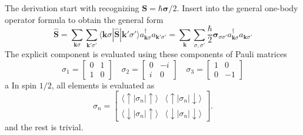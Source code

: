 \documentclass[../../../main.tex]{subfiles}
\begin{document}
The derivation start with recognizing $\mathbf{S }= \hbar \boldsymbol{\sigma }/2$.
Insert into the general one-body operator formula to obtain the general form
\begin{equation*}
  \mathbf{\hat{S} }
  = \sum_{\mathbf{k}\sigma} \sum_{\mathbf{k}'\sigma'}  \langle \mathbf{k}\sigma|\mathbf{\hat{S}}|\mathbf{k}'\sigma'\rangle a^\dagger_{\mathbf{k}\sigma} a_{\mathbf{k}'\sigma'}
  = \sum_{\mathbf{k}}\sum_{\sigma,\sigma'} \frac{\hbar}{2}\boldsymbol{\sigma}_{\sigma\sigma'} a^\dagger_{\mathbf{k}\sigma} a_{\mathbf{k}\sigma'}
\end{equation*}
The explicit component is evaluated using these components of Pauli matrices
\begin{equation*}
  \sigma_1 =
  \begin{bmatrix}
    0 & 1 \\
    1 & 0
  \end{bmatrix}
  \quad
  \sigma_2 =
  \begin{bmatrix}
    0 & -i \\
    i & 0
  \end{bmatrix}
  \quad
  \sigma_3    =
  \begin{bmatrix}
    1 & 0  \\
    0 & -1
  \end{bmatrix}
\end{equation*}a
In spin $1/2$, all elements is evaluated as
\begin{equation*}
  \sigma_n =
  \begin{bmatrix}
    \langle\uparrow|\sigma_n|\uparrow\rangle   & \langle\uparrow|\sigma_n|\downarrow\rangle   \\[6pt]
    \langle\downarrow|\sigma_n|\uparrow\rangle & \langle\downarrow|\sigma_n|\downarrow\rangle
  \end{bmatrix}.
\end{equation*}
and the rest is trivial.
\end{document}
